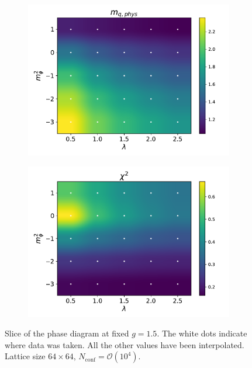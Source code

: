 \begin{figure}[]
\begin{subfigure}[b]{0.47\textwidth}
        \includegraphics[width=\textwidth]{figures/phase_diagram/m-lam/phase_diagram_mqphys.pdf}
    \end{subfigure}
    \begin{subfigure}[b]{0.47\textwidth}
        \includegraphics[width=\textwidth]{figures/phase_diagram/m-lam/phase_diagram_chi2.pdf}
    \end{subfigure}
    \caption[Phase diagram in the $\lambda-m_\phi^2$ plane]{Slice of the phase diagram at fixed $g = 1.5$. The white dots indicate where data was taken. All the other values have been interpolated. Lattice size $64 \times 64$, $N_\text{conf} = \mathcal{O}(10^4)$. }
    \label{fig:phase_diagram_m_lam}
\end{figure}
